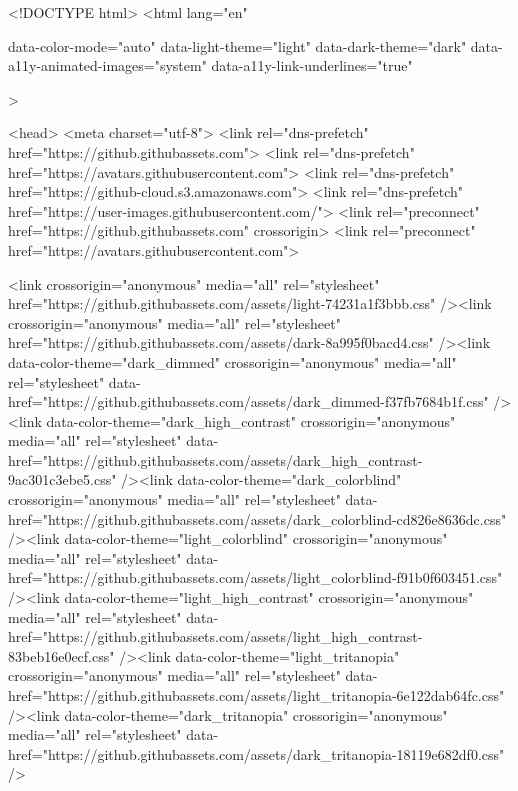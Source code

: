 





<!DOCTYPE html>
<html
  lang="en"
  
  data-color-mode="auto" data-light-theme="light" data-dark-theme="dark"
  data-a11y-animated-images="system" data-a11y-link-underlines="true"
  
  >



  <head>
    <meta charset="utf-8">
  <link rel="dns-prefetch" href="https://github.githubassets.com">
  <link rel="dns-prefetch" href="https://avatars.githubusercontent.com">
  <link rel="dns-prefetch" href="https://github-cloud.s3.amazonaws.com">
  <link rel="dns-prefetch" href="https://user-images.githubusercontent.com/">
  <link rel="preconnect" href="https://github.githubassets.com" crossorigin>
  <link rel="preconnect" href="https://avatars.githubusercontent.com">

  


  <link crossorigin="anonymous" media="all" rel="stylesheet" href="https://github.githubassets.com/assets/light-74231a1f3bbb.css" /><link crossorigin="anonymous" media="all" rel="stylesheet" href="https://github.githubassets.com/assets/dark-8a995f0bacd4.css" /><link data-color-theme="dark_dimmed" crossorigin="anonymous" media="all" rel="stylesheet" data-href="https://github.githubassets.com/assets/dark_dimmed-f37fb7684b1f.css" /><link data-color-theme="dark_high_contrast" crossorigin="anonymous" media="all" rel="stylesheet" data-href="https://github.githubassets.com/assets/dark_high_contrast-9ac301c3ebe5.css" /><link data-color-theme="dark_colorblind" crossorigin="anonymous" media="all" rel="stylesheet" data-href="https://github.githubassets.com/assets/dark_colorblind-cd826e8636dc.css" /><link data-color-theme="light_colorblind" crossorigin="anonymous" media="all" rel="stylesheet" data-href="https://github.githubassets.com/assets/light_colorblind-f91b0f603451.css" /><link data-color-theme="light_high_contrast" crossorigin="anonymous" media="all" rel="stylesheet" data-href="https://github.githubassets.com/assets/light_high_contrast-83beb16e0ecf.css" /><link data-color-theme="light_tritanopia" crossorigin="anonymous" media="all" rel="stylesheet" data-href="https://github.githubassets.com/assets/light_tritanopia-6e122dab64fc.css" /><link data-color-theme="dark_tritanopia" crossorigin="anonymous" media="all" rel="stylesheet" data-href="https://github.githubassets.com/assets/dark_tritanopia-18119e682df0.css" />


